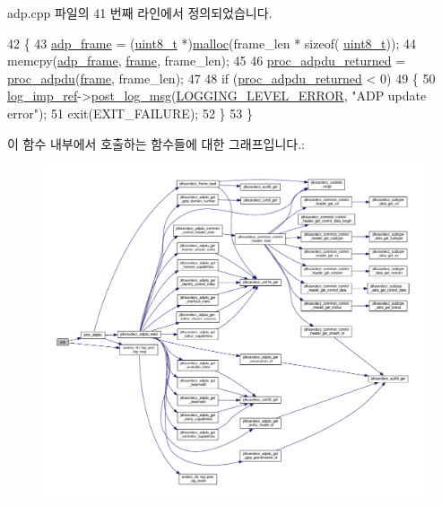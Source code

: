 adp.\+cpp 파일의 41 번째 라인에서 정의되었습니다.


\begin{DoxyCode}
42 \{
43     \hyperlink{classavdecc__lib_1_1adp_a81272560b45748ffdcb020bce0a97fcf}{adp\_frame} = (\hyperlink{stdint_8h_aba7bc1797add20fe3efdf37ced1182c5}{uint8\_t} *)\hyperlink{_memory_leak_detector_malloc_macros_8h_ab8b25cd8f16d4a6552afe4e65c4f082d}{malloc}(frame\_len * \textcolor{keyword}{sizeof}(
      \hyperlink{stdint_8h_aba7bc1797add20fe3efdf37ced1182c5}{uint8\_t}));
44     memcpy(\hyperlink{classavdecc__lib_1_1adp_a81272560b45748ffdcb020bce0a97fcf}{adp\_frame}, \hyperlink{gst__avb__playbin_8c_ac8e710e0b5e994c0545d75d69868c6f0}{frame}, frame\_len);
45 
46     \hyperlink{classavdecc__lib_1_1adp_a8b55e1a3a594d836a9a547d6a35523a1}{proc\_adpdu\_returned} = \hyperlink{classavdecc__lib_1_1adp_aa01b5685d3561b5c20763cad1a42f8a9}{proc\_adpdu}(\hyperlink{gst__avb__playbin_8c_ac8e710e0b5e994c0545d75d69868c6f0}{frame}, frame\_len);
47 
48     \textcolor{keywordflow}{if} (\hyperlink{classavdecc__lib_1_1adp_a8b55e1a3a594d836a9a547d6a35523a1}{proc\_adpdu\_returned} < 0)
49     \{
50         \hyperlink{namespaceavdecc__lib_acbe3e2a96ae6524943ca532c87a28529}{log\_imp\_ref}->\hyperlink{classavdecc__lib_1_1log_a68139a6297697e4ccebf36ccfd02e44a}{post\_log\_msg}(\hyperlink{namespaceavdecc__lib_a501055c431e6872ef46f252ad13f85cdaf2c4481208273451a6f5c7bb9770ec8a}{LOGGING\_LEVEL\_ERROR}, \textcolor{stringliteral}{"ADP
       update error"});
51         exit(EXIT\_FAILURE);
52     \}
53 \}
\end{DoxyCode}


이 함수 내부에서 호출하는 함수들에 대한 그래프입니다.\+:
\nopagebreak
\begin{figure}[H]
\begin{center}
\leavevmode
\includegraphics[width=350pt]{classavdecc__lib_1_1adp_a697b1c432340d54d1787167c2a376709_cgraph}
\end{center}
\end{figure}


